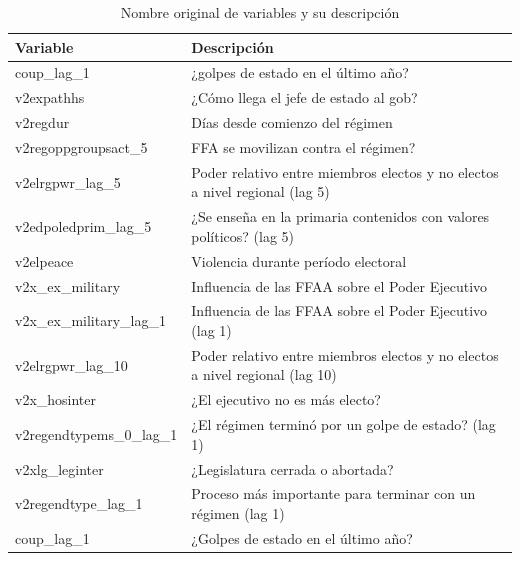\documentclass{article}
\begin{document}
\begin{table}[H]
  \begin{tabular}{ll}
    \toprule
    Variable                  & Descripción \\
    \midrule
    coup\_lag\_1              & ¿golpes de estado en el último año? \\
    v2expathhs                & ¿Cómo llega el jefe de estado al gob? \\
    v2regdur                  & Días desde comienzo del régimen \\
    v2regoppgroupsact\_5      & FFA se movilizan contra el régimen? \\
    v2elrgpwr\_lag\_5         & Poder relativo entre miembros electos y no electos a nivel regional (lag 5) \\
    v2edpoledprim\_lag\_5     & ¿Se enseña en la primaria contenidos con valores políticos? (lag 5) \\
    v2elpeace                 & Violencia durante período electoral \\
    v2x\_ex\_military         & Influencia de las FFAA sobre  el Poder Ejecutivo \\
    v2x\_ex\_military\_lag\_1 & Influencia de las FFAA sobre el Poder Ejecutivo (lag 1) \\
    v2elrgpwr\_lag\_10        & Poder relativo entre miembros electos y no electos a nivel regional (lag 10) \\
    v2x\_hosinter             & ¿El ejecutivo no es más electo? \\
    v2regendtypems\_0\_lag\_1 & ¿El régimen terminó por un golpe de estado? (lag 1) \\
    v2xlg\_leginter           & ¿Legislatura cerrada o abortada? \\
    v2regendtype\_lag\_1      & Proceso más importante para terminar con un régimen (lag 1) \\
    coup\_lag\_1              & ¿Golpes de estado en el último año? \\
    \bottomrule 
    \end{tabular}
  \caption{Nombre original de variables y su descripción \label{tab:vars}}
\end{table}

\printbibliography
\end{document}
